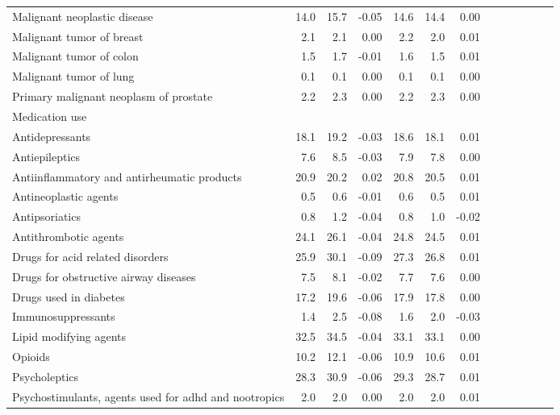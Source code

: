\documentclass[11pt,]{article}
\begin{document}
\begin{longtable}{lrrrrrrrrrrrr}
      Malignant neoplastic disease & 14.0 & 15.7 & -0.05 & 14.6 & 14.4 &  0.00 \\ 
      Malignant tumor of breast &  2.1 &  2.1 &  0.00 &  2.2 &  2.0 &  0.01 \\ 
      Malignant tumor of colon &  1.5 &  1.7 & -0.01 &  1.6 &  1.5 &  0.01 \\ 
      Malignant tumor of lung &  0.1 &  0.1 &  0.00 &  0.1 &  0.1 &  0.00 \\ 
      Primary malignant neoplasm of prostate &  2.2 &  2.3 &  0.00 &  2.2 &  2.3 &  0.00 \\ 
  Medication use &    &    &     &    &    &     \\ 
      Antidepressants & 18.1 & 19.2 & -0.03 & 18.6 & 18.1 &  0.01 \\ 
      Antiepileptics &  7.6 &  8.5 & -0.03 &  7.9 &  7.8 &  0.00 \\ 
      Antiinflammatory and antirheumatic products & 20.9 & 20.2 &  0.02 & 20.8 & 20.5 &  0.01 \\ 
      Antineoplastic agents &  0.5 &  0.6 & -0.01 &  0.6 &  0.5 &  0.01 \\ 
      Antipsoriatics &  0.8 &  1.2 & -0.04 &  0.8 &  1.0 & -0.02 \\ 
      Antithrombotic agents & 24.1 & 26.1 & -0.04 & 24.8 & 24.5 &  0.01 \\ 
      Drugs for acid related disorders & 25.9 & 30.1 & -0.09 & 27.3 & 26.8 &  0.01 \\ 
      Drugs for obstructive airway diseases &  7.5 &  8.1 & -0.02 &  7.7 &  7.6 &  0.00 \\ 
      Drugs used in diabetes & 17.2 & 19.6 & -0.06 & 17.9 & 17.8 &  0.00 \\ 
      Immunosuppressants &  1.4 &  2.5 & -0.08 &  1.6 &  2.0 & -0.03 \\ 
      Lipid modifying agents & 32.5 & 34.5 & -0.04 & 33.1 & 33.1 &  0.00 \\ 
      Opioids & 10.2 & 12.1 & -0.06 & 10.9 & 10.6 &  0.01 \\ 
      Psycholeptics & 28.3 & 30.9 & -0.06 & 29.3 & 28.7 &  0.01 \\ 
      Psychostimulants, agents used for adhd and nootropics &  2.0 &  2.0 &  0.00 &  2.0 &  2.0 &  0.01 \\ 
   \bottomrule\end{longtable}
\clearpage
{}
\end{document}
